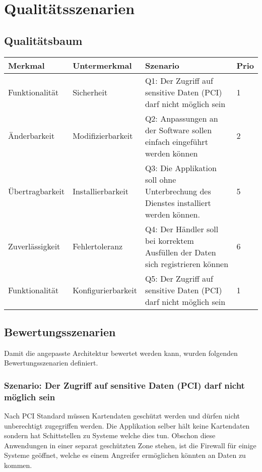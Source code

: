 \chapter{Qualitätsszenarien}
\label{sec:qualityscenarios}

\section{Qualitätsbaum}
\begin{table}[H]
	\centering
	\begin{tabular}{ | p{3cm} | p{3.5cm} | p{6.5cm} | p{1cm} | }
		\toprule
		{\textbf{Merkmal}} & {\textbf{Untermerkmal}} & {\textbf{Szenario}} & {\textbf{Prio}} \\
		\midrule
		Funktionalität & Sicherheit & Q1: Der Zugriff auf sensitive Daten (PCI) darf nicht möglich sein & 1 \\ \hline
		Änderbarkeit & Modifizierbarkeit & Q2: Anpassungen an der Software sollen einfach eingeführt werden können & 2 \\ \hline
		Übertragbarkeit & Installierbarkeit & Q3: Die Applikation soll ohne Unterbrechung des Dienstes installiert werden können. & 5 \\ \hline
		Zuverlässigkeit & Fehlertoleranz & Q4: Der Händler soll bei korrektem Ausfüllen der Daten sich registrieren können & 6 \\ \hline
		Funktionalität & Konfigurierbarkeit & Q5: Der Zugriff auf sensitive Daten (PCI) darf nicht möglich sein & 1 \\
		\bottomrule
	\end{tabular}
\end{table}
\newpage
\section{Bewertungsszenarien}

Damit die angepasste Architektur bewertet werden kann, wurden folgenden Bewertungsszenarien definiert. 

\subsection{Szenario: Der Zugriff auf sensitive Daten (PCI) darf nicht möglich sein}
Nach PCI Standard müssen Kartendaten geschützt werden und dürfen nicht unberechtigt zugegriffen werden. Die Applikation selber hält keine Kartendaten sondern hat Schittstellen zu Systeme welche dies tun. Obschon diese Anwendungen in einer separat geschützten Zone stehen, ist die Firewall für einige Systeme geöffnet, welche es einem Angreifer ermöglichen könnten an Daten zu kommen.

